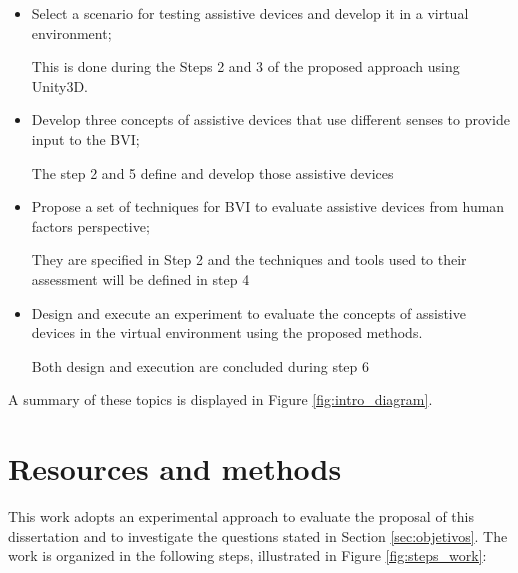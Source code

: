  \begin{itemize}
     \item Select a scenario for testing assistive devices and develop it in a virtual environment; \label{itm:subobj_first}
     
     This is done during the Steps 2 and 3 of the proposed approach using Unity3D.

     \item Develop three concepts of assistive devices that use different senses to provide input to the BVI; \label{itm:subobj_second}
     
     The step 2 and 5 define and develop those assistive devices

     \item Propose a set of techniques for BVI to evaluate assistive devices from human factors perspective; \label{itm:subobj_third}
     
    They are specified in Step 2 and the techniques and tools used to their assessment will be defined in step 4

     \item Design and execute an experiment to evaluate the concepts of assistive devices in the virtual environment using the proposed  methods. \label{itm:subobj_forth}
    
    Both design and execution are concluded during step 6

 \end{itemize}

 A summary of these topics is displayed in Figure \ref{fig:intro_diagram}.     

 

\section{Resources and methods} 

This work adopts an experimental approach to evaluate the proposal of this dissertation and to investigate the questions stated in Section \ref{sec:objetivos}. 
The work is organized in the following steps, illustrated in Figure \ref{fig:steps_work}:

